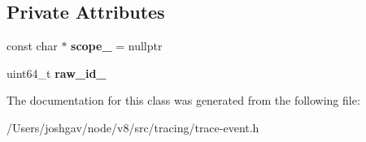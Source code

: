 \subsection*{Private Attributes}
\begin{DoxyCompactItemize}
\item 
const char $\ast$ {\bfseries scope\+\_\+} = nullptr\hypertarget{classv8_1_1internal_1_1tracing_1_1_trace_i_d_a045957036fbe1ea3e19acb895e2a57ca}{}\label{classv8_1_1internal_1_1tracing_1_1_trace_i_d_a045957036fbe1ea3e19acb895e2a57ca}

\item 
uint64\+\_\+t {\bfseries raw\+\_\+id\+\_\+}\hypertarget{classv8_1_1internal_1_1tracing_1_1_trace_i_d_ab23018ccf2eb0dbbd5b52562a9953950}{}\label{classv8_1_1internal_1_1tracing_1_1_trace_i_d_ab23018ccf2eb0dbbd5b52562a9953950}

\end{DoxyCompactItemize}


The documentation for this class was generated from the following file\+:\begin{DoxyCompactItemize}
\item 
/\+Users/joshgav/node/v8/src/tracing/trace-\/event.\+h\end{DoxyCompactItemize}
